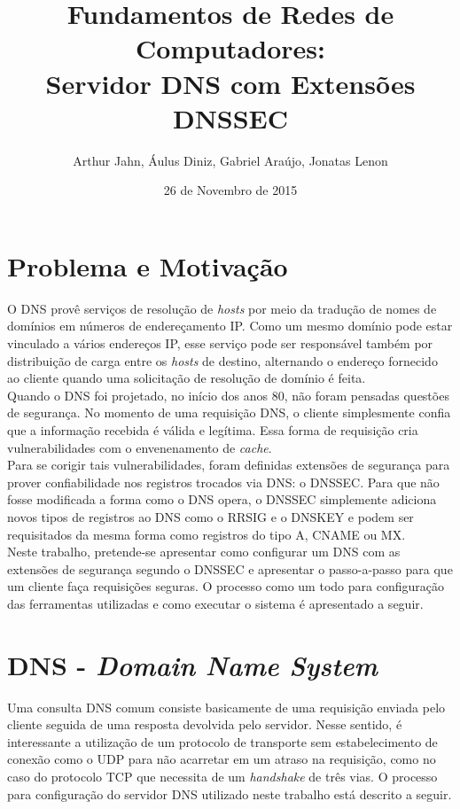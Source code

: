 \documentclass[12pt,openright,a4paper]{report}
\title{Fundamentos de Redes de Computadores: \\ Servidor DNS com Extensões DNSSEC}
\author{Arthur Jahn, Áulus Diniz, Gabriel Araújo, Jonatas Lenon}
\date{26 de Novembro de 2015}    %
\begin{document}
\maketitle  %

\pagebreak

\tableofcontents %
\chapter{Problema e Motivação}
\label{chap_problema}

O DNS provê serviços de resolução de \textit{hosts} por meio da tradução de nomes de domínios em números de endereçamento IP. Como um mesmo domínio pode estar vinculado a vários endereços IP, esse serviço pode ser responsável também por distribuição de carga entre os \textit{hosts} de destino, alternando o endereço fornecido ao cliente quando uma solicitação de resolução de domínio é feita.\\

Quando o DNS foi projetado, no início dos anos 80, não foram pensadas questões de segurança. No momento de uma requisição DNS, o cliente simplesmente confia que a informação recebida é válida e legítima. Essa forma de requisição cria vulnerabilidades com o envenenamento de \textit{cache}.\\

Para se corigir tais vulnerabilidades, foram definidas extensões de segurança para prover confiabilidade nos registros trocados via DNS: o DNSSEC. Para que não fosse modificada a forma como o DNS opera, o DNSSEC simplemente adiciona novos tipos de registros ao DNS como o RRSIG e o DNSKEY e podem ser requisitados da mesma forma como registros do tipo A, CNAME ou MX.\\

Neste trabalho, pretende-se apresentar como configurar um DNS com as extensões de segurança segundo o DNSSEC e apresentar o passo-a-passo para que um cliente faça requisições seguras. O processo como um todo para configuração das ferramentas utilizadas e como executar o sistema é apresentado a seguir.

\chapter{DNS  - \textit{Domain Name System}}
\label{chap_dns}

Uma consulta DNS comum consiste basicamente de uma requisição enviada pelo cliente seguida de uma resposta devolvida pelo servidor. Nesse sentido, é interessante a utilização de um protocolo de transporte sem estabelecimento de conexão como o UDP para não acarretar em um atraso na requisição, como no caso do protocolo TCP que necessita de um \textit{handshake} de três vias. O processo para configuração do servidor DNS utilizado neste trabalho está descrito a seguir.
\end{document}
